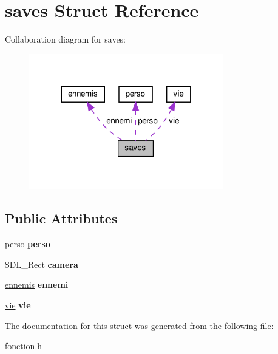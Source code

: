 \hypertarget{structsaves}{}\section{saves Struct Reference}
\label{structsaves}


Collaboration diagram for saves\+:
\nopagebreak
\begin{figure}[H]
\begin{center}
\leavevmode
\includegraphics[width=239pt]{structsaves__coll__graph}
\end{center}
\end{figure}
\subsection*{Public Attributes}
\begin{DoxyCompactItemize}
\item 
\mbox{\label{structsaves_a4ba3cba27704215b96311513ee206401}} 
\hyperlink{structperso}{perso} {\bfseries perso}
\item 
\mbox{\label{structsaves_a4797f7d3b3a1bf30019ec24e4f20b3f1}} 
S\+D\+L\+\_\+\+Rect {\bfseries camera}
\item 
\mbox{\label{structsaves_a94068fb387d61dec9a3f03296d5f2c38}} 
\hyperlink{structennemis}{ennemis} {\bfseries ennemi}
\item 
\mbox{\label{structsaves_ad07a79adf13feb4ffe0f035724ddb04b}} 
\hyperlink{structvie}{vie} {\bfseries vie}
\end{DoxyCompactItemize}


The documentation for this struct was generated from the following file\+:\begin{DoxyCompactItemize}
\item 
fonction.\+h\end{DoxyCompactItemize}
